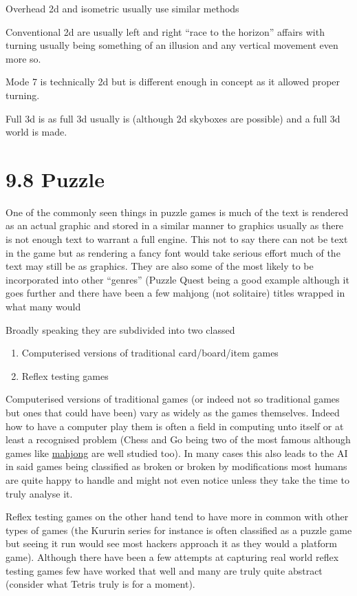 \documentclass[
]{book}
\providecommand{\tightlist}{%
  \setlength{\itemsep}{0pt}\setlength{\parskip}{0pt}}
\begin{document}
Overhead 2d and isometric usually use similar methods

Conventional 2d are usually left and right ``race to the horizon'' affairs with turning usually being something of an illusion and any vertical movement even more so.

Mode 7 is technically 2d but is different enough in concept as it allowed proper turning.

Full 3d is as full 3d usually is (although 2d skyboxes are possible) and a full 3d world is made.

\hypertarget{puzzle}{%
\section{9.8 Puzzle}\label{puzzle}}

One of the commonly seen things in puzzle games is much of the text is rendered as an actual graphic and stored in a similar manner to graphics usually as there is not enough text to warrant a full engine. This not to say there can not be text in the game but as rendering a fancy font would take serious effort much of the text may still be as graphics. They are also some of the most likely to be incorporated into other ``genres'' (Puzzle Quest being a good example although it goes further and there have been a few mahjong (not solitaire) titles wrapped in what many would

Broadly speaking they are subdivided into two classed

\begin{enumerate}
\def\labelenumi{\arabic{enumi}.}
\tightlist
\item
  Computerised versions of traditional card/board/item games
\item
  Reflex testing games
\end{enumerate}

Computerised versions of traditional games (or indeed not so traditional games but ones that could have been) vary as widely as the games themselves. Indeed how to have a computer play them is often a field in computing unto itself or at least a recognised problem (Chess and Go being two of the most famous although games like \href{http://cs229.stanford.edu/proj2009/Loh.pdf}{mahjong} are well studied too). In many cases this also leads to the AI in said games being classified as broken or broken by modifications most humans are quite happy to handle and might not even notice unless they take the time to truly analyse it.

Reflex testing games on the other hand tend to have more in common with other types of games (the Kururin series for instance is often classified as a puzzle game but seeing it run would see most hackers approach it as they would a platform game). Although there have been a few attempts at capturing real world reflex testing games few have worked that well and many are truly quite abstract (consider what Tetris truly is for a moment).
\end{document}
